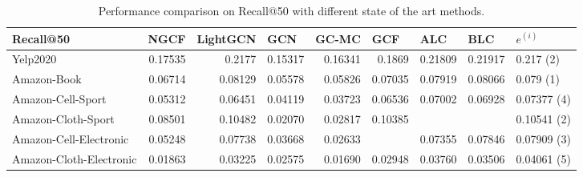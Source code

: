 \begin{table*}[]
    \centering
    \begin{tabular}{|l|r|r|r|r|r||r|r|l|}
        \hline
        Recall@50               & \multicolumn{1}{l|}{NGCF} & \multicolumn{1}{l|}{LightGCN} & \multicolumn{1}{l|}{GCN} & \multicolumn{1}{l|}{GC-MC} & \multicolumn{1}{l||}{GCF} & \multicolumn{1}{l|}{ALC} & \multicolumn{1}{l|}{BLC} & $e^{(i)}$   \\ \hline
        Yelp2020                & 0.17535                   & 0.2177                        & 0.15317                  & 0.16341                    & 0.1869                    & 0.21809                  & 0.21917                  & 0.217 (2)   \\ \hline
        Amazon-Book             & 0.06714                   & 0.08129                       & 0.05578                  & 0.05826                    & 0.07035                   & 0.07919                  & 0.08066                  & 0.079 (1)   \\ \hline
        Amazon-Cell-Sport       & 0.05312                   & 0.06451                       & 0.04119                  & 0.03723                    & 0.06536                   & 0.07002                  & 0.06928                  & 0.07377 (4) \\ \hline
        Amazon-Cloth-Sport      & 0.08501                   & 0.10482                       & 0.02070                  & 0.02817                    & 0.10385                   &                          &                          & 0.10541 (2) \\ \hline
        Amazon-Cell-Electronic  & 0.05248                   & 0.07738                       & 0.03668                  & 0.02633                    &                           & 0.07355                  & 0.07846                  & 0.07909 (3) \\ \hline
        Amazon-Cloth-Electronic & 0.01863                   & 0.03225                       & 0.02575                  & 0.01690                    & 0.02948                   & 0.03760                  & 0.03506                  & 0.04061 (5) \\ \hline
    \end{tabular}
    \caption{Performance comparison on Recall@50 with different state of the art methods.}
    \label{tab:recallbaselines}
\end{table*}